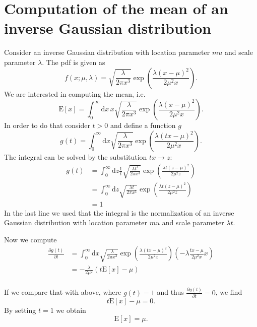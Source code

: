 \documentclass{scrreprt}
\renewcommand{\d}{{\mathrm{d}}}
\begin{document}
\chapter*{Computation of the mean of an inverse Gaussian distribution}
Consider an inverse Gaussian distribution with location parameter $mu$ and scale parameter $\lambda$. The pdf is given as
\begin{equation*}
 f(x;\mu ,\lambda )= \sqrt{\frac{\lambda }{2\pi x^{3}}} \exp \left( \frac{\lambda (x-\mu )^{2}}{2\mu ^{2}x} \right).
\end{equation*}
We are interested in computing the mean, i.e.
\begin{equation*}
\mathrm{E}[x] = \int_{0}^{\infty}\d x\,x\sqrt{\frac{\lambda }{2\pi x^{3}}} \exp \left( \frac{\lambda (x-\mu )^{2}}{2\mu ^{2}x} \right).
\end{equation*}
In order to do that consider $t > 0$ and define a function $g$
\begin{equation*}
g(t) = \int_{0}^{\infty}\d x\sqrt{\frac{\lambda }{2\pi x^{3}}} \exp \left( \frac{\lambda (tx-\mu )^{2}}{2\mu ^{2}x} \right).
\end{equation*}
The integral can be solved by the substitution $tx \rightarrow z$:
\begin{align*}
g(t)&=\int_{0}^{\infty}\d z\frac{1}{t}\sqrt{\frac{\lambda t^3}{2\pi x^{3}}} \exp \left( \frac{\lambda t(z-\mu )^{2}}{2\mu ^{2}z} \right)\\
&=\int_{0}^{\infty}\d z\sqrt{\frac{\lambda t}{2\pi x^{3}}} \exp \left( \frac{\lambda t(z-\mu )^{2}}{2\mu ^{2}z} \right)\\
&=1
\end{align*}
In the last line we used that the integral is the normalization of an inverse Gaussian distribution with location parameter $mu$ and scale parameter $\lambda t$.

Now we compute 
\begin{align*}
\frac{\partial g(t)}{\partial t}&=\int_{0}^{\infty}\d x\sqrt{\frac{\lambda }{2\pi x^{3}}} \exp \left( \frac{\lambda (tx-\mu )^{2}}{2\mu ^{2}x} \right)\left(- \lambda\frac{tx-\mu}{2 \mu^2 x}x\right)\\
&=-\frac{\lambda}{2 \mu^2}\left(t\mathrm{E}[x]-\mu\right)\\
\end{align*}

If we compare that with above, where $g(t) = 1 $ and thus  $\frac{\partial g(t)}{\partial t}=0$, we find
\begin{equation*}
t\mathrm{E}[x]-\mu = 0.
\end{equation*}
By setting $t = 1$ we obtain
\begin{equation*}
\mathrm{E}[x] = \mu.
\end{equation*}
\end{document}
